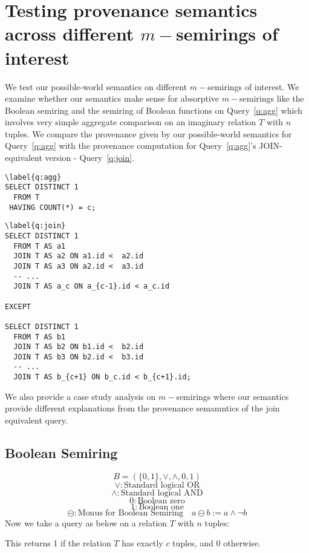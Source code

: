 \section{Testing provenance semantics across different $m-$semirings of interest}
We test our possible-world semantics on different $m-$semirings of interest. We examine whether our semantics make 
sense for absorptive $m-$semirings like the Boolean semiring and the semiring of Boolean functions on Query~\ref{q:agg} which involves very simple aggregate comparison on an imaginary relation $T$ with 
$n$ tuples. We compare the provenance given by our possible-world 
semantics for Query~\ref{q:agg} with the provenance computation for Query~\ref{q:agg}'s \textsc{JOIN}-equivalent version - Query~\ref{q:join}.   

\begin{listing}[h!]
  \begin{verbatim}\label{q:agg}
SELECT DISTINCT 1
  FROM T
 HAVING COUNT(*) = c;
\end{verbatim}
\end{listing}
\begin{listing}[h!]
\begin{verbatim}\label{q:join}
SELECT DISTINCT 1
  FROM T AS a1
  JOIN T AS a2 ON a1.id <  a2.id
  JOIN T AS a3 ON a2.id <  a3.id
  -- ...
  JOIN T AS a_c ON a_{c-1}.id < a_c.id

EXCEPT

SELECT DISTINCT 1
  FROM T AS b1
  JOIN T AS b2 ON b1.id <  b2.id
  JOIN T AS b3 ON b2.id <  b3.id
  -- ...
  JOIN T AS b_{c+1} ON b_c.id < b_{c+1}.id;
\end{verbatim}
\end{listing}
We also provide a case study analysis on $m-$semirings where our semantics 
provide different explanations from the provenance semamntics of the join equivalent query.
\subsection{Boolean Semiring}
$$B = (\{0,1\}, \lor, \land, 0, 1)$$
$$\lor : \text{Standard logical OR}$$
$$\land : \text{Standard logical AND}$$
$$0 : \text{Boolean zero}$$
$$1 : \text{Boolean one}$$
\[
\ominus: \text{Monus for Boolean Semiring} \quad a \ominus b := a \land \neg b
\]
Now we take a query as below on a relation $T$ with $n$ tuples:

This returns 1 if the relation $T$ has exactly $c$ tuples, and 0 otherwise.

